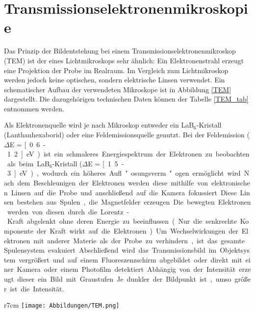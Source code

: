 \section{Transmissionselektronenmikroskopie} %
\label{sec:elektron_spektroskopie}

Das Prinzip der Bildentstehung bei einem Transmissionselektronenmikroskop (TEM) ist der eines Lichtmikroskops sehr ähnlich:
Ein Elektronenstrahl erzeugt eine Projektion der Probe im Realraum.
Im Vergleich zum Lichtmikroskop werden jedoch keine optischen, sondern elektrische Linsen verwendet.
Ein schematischer Aufbau der verwendeten Mikroskope ist in Abbildung \ref{TEM} dargestellt.
Die dazugehörigen technischen Daten können der Tabelle \ref{TEM_tab} entnommen werden.

Als Elektronenquelle wird je nach Mikroskop entweder ein LaB$_6$-Kris\-tall (Lanthanhexaborid) oder eine Feldemissionsquelle genutzt.
Bei der Feldemission ($\Delta$E = \unit[0.6-1.2]{eV}) ist ein schmaleres Energiespektrum der Elektronen zu beobachten als beim LaB$_6$-Kris\-tall ($\Delta$E = \unit[1.5-3]{eV}), wodurch ein höheres Aufl"osungsverm"ogen ermöglicht wird.
Nach dem Beschleunigen der Elektronen werden diese mithilfe von elektronischen Linsen auf die Probe und anschließend auf die Kamera fokussiert.
Diese Linsen bestehen aus Spulen, die Magnetfelder erzeugen.
Die bewegten Elektronen werden von diesen durch die Lorentz-Kraft abgelenkt ohne deren Energie zu beeinflussen (Nur die senkrechte Komponente der Kraft wirkt auf die Elektronen).
Um Wechselwirkungen der Elektronen mit anderer Materie als der Probe zu verhindern, ist das gesamte Spulensystem evakuiert.
Abschließend wird das Transmissionsbild im Objektsystem vergrößert und auf einem Fluoreszenzschirm abgebildet oder direkt mit einer Kamera oder einem Photofilm detektiert.
Abhängig von der Intensität erzeugt dieser ein Bild mit Graustufen.
Je dunkler der Bildpunkt ist, umso größer ist die Intensität.

\begin{wrapfigure}{r}{7cm}
	\centering
	\texttt{[image: Abbildungen/TEM.png]}
	\caption[Schematische Aufbau eines Transmissionselektronenmikroskops]{Schematische Aufbau eines Transmissionselektronenmikroskops. (\cite{jeol}:Benutzerhandbuch JEOL Ltd.)}
	\label{TEM}
\end{wrapfigure}

